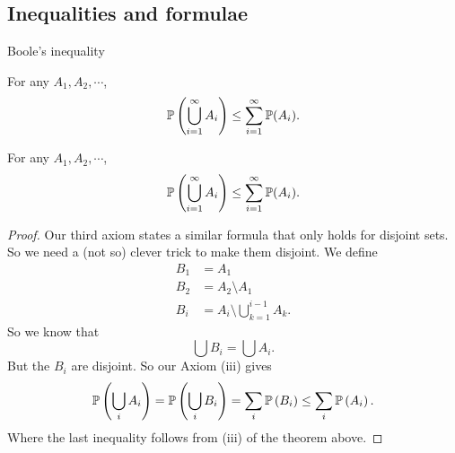 \subsection{Inequalities and formulae}

%
\begin{note}
  \begin{field}
    Boole's inequality
  \end{field}
  \begin{field}
    \begin{thm}
      For any $A_1, A_2, \cdots$,
      \[
        \P\left(\bigcup_{i = 1}^\infty A_i\right) \leq \sum_{i = 1}^\infty \P(A_i).
      \]
    \end{thm}
  \end{field}
  \xplain{}%
\end{note}

%
\begin{note}
  \begin{field}
    \begin{thm}
      For any $A_1, A_2, \cdots$,
      \[
        \P\left(\bigcup_{i = 1}^\infty A_i\right) \leq \sum_{i = 1}^\infty \P(A_i).
      \]
    \end{thm}
  \end{field}
  \begin{field}
    \begin{proof}
      Our third axiom states a similar formula that only holds for disjoint sets. So we need a (not so) clever trick to make them disjoint. We define
      \begin{align*}
        B_1 &= A_1\\
        B_2 &= A_2\setminus A_1\\
        B_i &= A_i\setminus \bigcup_{k = 1}^{i - 1}A_k.
      \end{align*}
      So we know that
      \[
        \bigcup B_i = \bigcup A_i.
      \]
      But the $B_i$ are disjoint. So our Axiom (iii) gives
      \[
        \P\left(\bigcup_i A_i\right) = \P\left(\bigcup _i B_i\right) = \sum_i \P\left(B_i\right) \leq \sum_i \P\left(A_i\right).
      \]
      Where the last inequality follows from (iii) of the theorem above.
    \end{proof}
  \end{field}
  \xplain{}%
\end{note}

